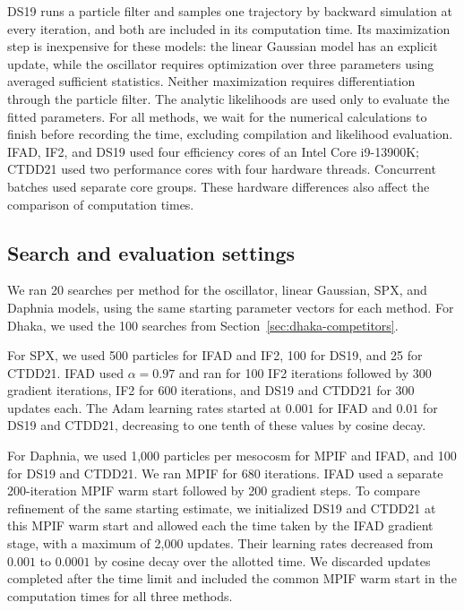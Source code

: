 \documentclass[11pt]{article}
\theoremstyle{thmstylethree}%
\begin{document}
DS19 runs a particle filter and samples one trajectory by backward
simulation at every iteration, and both are included in its computation
time. Its maximization step is inexpensive for these models: the linear
Gaussian model has an explicit update, while the oscillator requires
optimization over three parameters using averaged sufficient statistics.
Neither maximization requires differentiation through the particle filter.
The analytic likelihoods are used only to evaluate the fitted parameters.
For all methods, we wait for the numerical calculations to finish before
recording the time, excluding compilation and likelihood evaluation.
IFAD, IF2, and DS19 used four efficiency cores of an Intel Core i9-13900K;
CTDD21 used two performance cores with four hardware threads.
Concurrent batches used separate core groups. These hardware differences
also affect the comparison of computation times.

\subsection{Search and evaluation settings}
\label{sec:benchmark-settings}

We ran 20 searches per method for the oscillator, linear Gaussian, SPX,
and Daphnia models, using the same starting parameter vectors for each
method. For Dhaka, we used the 100 searches from
Section~\ref{sec:dhaka-competitors}.

For SPX, we used 500 particles for IFAD and IF2, 100 for DS19, and 25
for CTDD21. IFAD used $\alpha=0.97$ and ran for 100 IF2 iterations followed by 300 gradient
iterations, IF2 for 600 iterations, and DS19 and CTDD21 for 300 updates
each. The Adam learning rates started at $0.001$ for IFAD and $0.01$
for DS19 and CTDD21, decreasing to one tenth of these values by cosine decay.

For Daphnia, we used 1,000 particles per mesocosm for MPIF and IFAD,
and 100 for DS19 and CTDD21. We ran MPIF for 680 iterations.
IFAD used a separate 200-iteration MPIF warm start followed by 200
gradient steps. To compare refinement of the same starting estimate,
we initialized DS19 and CTDD21 at this MPIF warm start and allowed each
the time taken by the IFAD gradient stage, with a maximum of 2,000 updates.
Their learning rates decreased from $0.001$ to $0.0001$ by cosine decay
over the allotted time. We discarded updates completed after the time
limit and included the common MPIF warm start in the computation times
for all three methods.
\end{document}
